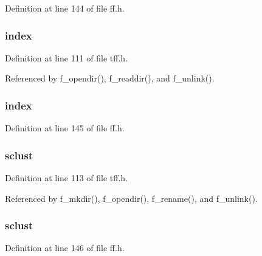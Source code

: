 Definition at line 144 of file ff.\-h.

\hypertarget{struct_d_i_r_a7cb92c69ac44a71424d6b8a0c3dac288}{
\subsubsection[{index}]{ index}}\label{struct_d_i_r_a7cb92c69ac44a71424d6b8a0c3dac288}


Definition at line 111 of file tff.\-h.



Referenced by f\-\_\-opendir(), f\-\_\-readdir(), and f\-\_\-unlink().

\hypertarget{struct_d_i_r_ab7c5089b70ce76bcd61abe615ed2a42b}{
\subsubsection[{index}]{ index}}\label{struct_d_i_r_ab7c5089b70ce76bcd61abe615ed2a42b}


Definition at line 145 of file ff.\-h.

\hypertarget{struct_d_i_r_aada1acd6ce100ead798e712b18c49547}{
\subsubsection[{sclust}]{ sclust}}\label{struct_d_i_r_aada1acd6ce100ead798e712b18c49547}


Definition at line 113 of file tff.\-h.



Referenced by f\-\_\-mkdir(), f\-\_\-opendir(), f\-\_\-rename(), and f\-\_\-unlink().

\hypertarget{struct_d_i_r_ad5d52f3fde971d2a05ff777a6243c252}{
\subsubsection[{sclust}]{ sclust}}\label{struct_d_i_r_ad5d52f3fde971d2a05ff777a6243c252}


Definition at line 146 of file ff.\-h.

